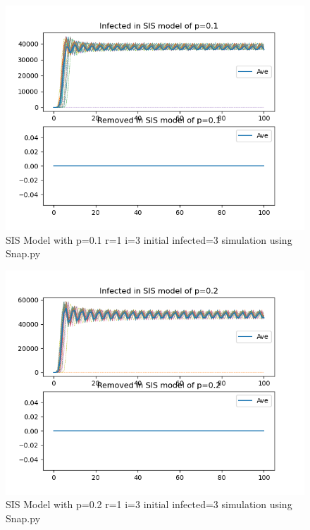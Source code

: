 \documentclass{subfile}
\begin{document}
  \begin{figure}
  \includegraphics[scale=0.8]{sisp01r1i3s3}
  \caption[SIS p=0.1,r=1,i=3,init infected=3]{SIS Model with p=0.1 r=1 i=3 initial infected=3 simulation using Snap.py}
  \end{figure}
  \begin{figure}
  \includegraphics[scale=0.8]{sisp02r1i3s3}
  \caption[SIS p=0.2,r=1,i=3,init infected=3]{SIS Model with p=0.2 r=1 i=3 initial infected=3 simulation using Snap.py}
  \end{figure}
\end{document}
